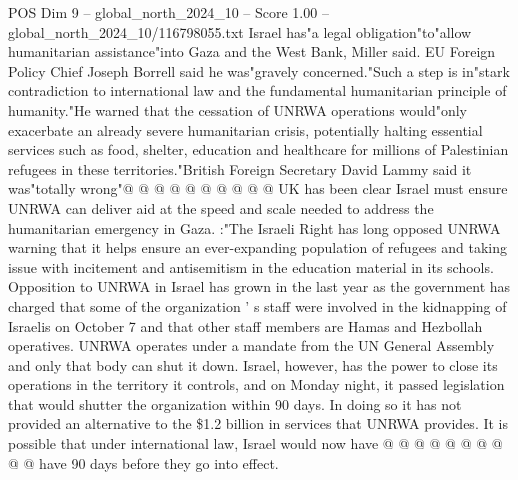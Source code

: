 \begin{textsample}{POS Dim 9 – global\_north\_2024\_10 – Score 1.00 – global\_north\_2024\_10/116798055.txt}
Israel has"a legal obligation"to"allow humanitarian assistance"into Gaza and the West Bank, Miller said.
EU Foreign Policy Chief Joseph Borrell said he was"gravely concerned."Such a step is in"stark contradiction to international law and the fundamental humanitarian principle of humanity."He warned that the cessation of UNRWA operations would"only exacerbate an already severe humanitarian crisis, potentially halting essential services such as food, shelter, education and healthcare for millions of Palestinian refugees in these territories."British Foreign Secretary David Lammy said it was"totally wrong"@ @ @ @ @ @ @ @ @ @ UK has been clear Israel must ensure UNRWA can deliver aid at the speed and scale needed to address the humanitarian emergency in Gaza. :"The Israeli Right has long opposed UNRWA warning that it helps ensure an ever-expanding population of refugees and taking issue with incitement and antisemitism in the education material in its schools.
Opposition to UNRWA in Israel has grown in the last year as the government has charged that some of the organization ' s staff were involved in the kidnapping of Israelis on October 7 and that other staff members are Hamas and Hezbollah operatives.
UNRWA operates under a mandate from the UN General Assembly and only that body can shut it down.
Israel, however, has the power to close its operations in the territory it controls, and on Monday night, it passed legislation that would shutter the organization within 90 days.
In doing so it has not provided an alternative to the \$1.2 billion in services that UNRWA provides.
It is possible that under international law, Israel would now have @ @ @ @ @ @ @ @ @ @ have 90 days before they go into effect.

\end{textsample}
